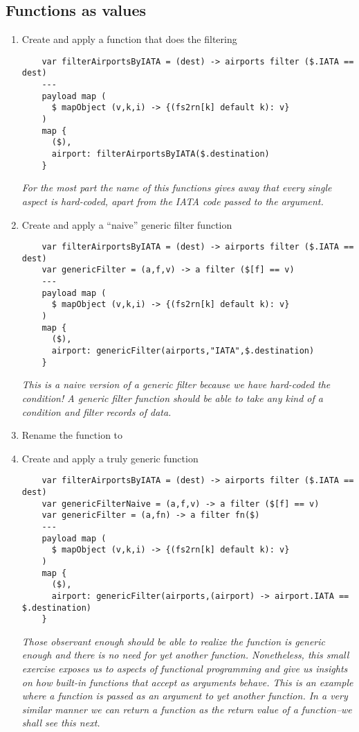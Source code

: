 \subsection{Functions as values}
\begin{enumerate}[resume*]
\item Create and apply a function that does the filtering
  \begin{lstlisting}
    var filterAirportsByIATA = (dest) -> airports filter ($.IATA == dest)
    ---
    payload map (
      $ mapObject (v,k,i) -> {(fs2rn[k] default k): v}
    )
    map {
      ($),
      airport: filterAirportsByIATA($.destination)
    }
  \end{lstlisting}
  \emph{
    For the most part the name of this functions gives away that every single aspect is hard-coded, apart from the IATA code passed to the  argument.
  }
\item Create and apply a ``naive'' generic filter function
  \begin{lstlisting}
    var filterAirportsByIATA = (dest) -> airports filter ($.IATA == dest)
    var genericFilter = (a,f,v) -> a filter ($[f] == v)
    ---
    payload map (
      $ mapObject (v,k,i) -> {(fs2rn[k] default k): v}
    )
    map {
      ($),
      airport: genericFilter(airports,"IATA",$.destination)
    }
  \end{lstlisting}
  \emph{
    This is a naive version of a generic filter because we have hard-coded the condition!  A generic filter function should be able to take any kind of a  condition and filter records of data.
  }
\item Rename the  function to 
\item Create and apply a truly generic function
  \begin{lstlisting}
    var filterAirportsByIATA = (dest) -> airports filter ($.IATA == dest)
    var genericFilterNaive = (a,f,v) -> a filter ($[f] == v)
    var genericFilter = (a,fn) -> a filter fn($)
    ---
    payload map (
      $ mapObject (v,k,i) -> {(fs2rn[k] default k): v}
    )
    map {
      ($),
      airport: genericFilter(airports,(airport) -> airport.IATA == $.destination)
    }
  \end{lstlisting}
  \emph{
    Those observant enough should be able to realize the  function is generic enough and there is no need for yet another function.  Nonetheless, this small exercise exposes us to aspects of functional programming and give us insights on how built-in functions that accept \lep{} as arguments behave.
    \newline
    This is an example where a function is passed as an argument to yet another function.  In a very similar manner we can return a function as the return value of a function--we shall see this next.
  }
\end{enumerate}

